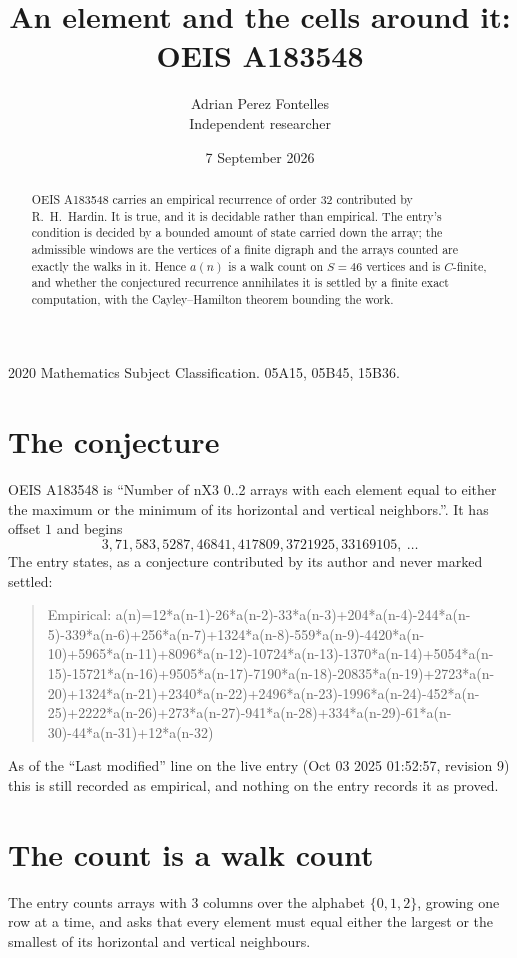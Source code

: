 \documentclass[11pt,a4paper]{article}
\title{An element and the cells around it: OEIS A183548}
\author{Adrian Perez Fontelles\\ \small Independent researcher}
\date{7 September 2026}
\theoremstyle{plain}
\theoremstyle{definition}
\begin{document}
\maketitle

\begin{abstract}
OEIS A183548 carries an empirical recurrence of order $32$ contributed by R.~H.~Hardin. It is
true, and it is decidable rather than empirical. The entry's condition is decided by a bounded amount of state carried down the array; the
admissible windows are the vertices of a finite digraph and the arrays counted are exactly the
walks in it. Hence $a(n)$ is a walk count on $S=46$ vertices and is $C$-finite, and whether the
conjectured recurrence annihilates it is settled by a finite exact computation, with the
Cayley--Hamilton theorem bounding the work.
\end{abstract}

\noindent\small 2020 Mathematics Subject Classification. 05A15, 05B45, 15B36.\normalsize

\section{The conjecture}

OEIS A183548 is ``Number of nX3 0..2 arrays with each element equal to either the maximum or the minimum of its horizontal and vertical neighbors.''. It has offset $1$ and begins
\[
3, 71, 583, 5287, 46841, 417809, 3721925, 33169105,\ \dots
\]
The entry states, as a conjecture contributed by its author and never marked settled:
\begin{quote}
Empirical: a(n)=12*a(n-1)-26*a(n-2)-33*a(n-3)+204*a(n-4)-244*a(n-5)-339*a(n-6)+256*a(n-7)+1324*a(n-8)-559*a(n-9)-4420*a(n-10)+5965*a(n-11)+8096*a(n-12)-10724*a(n-13)-1370*a(n-14)+5054*a(n-15)-15721*a(n-16)+9505*a(n-17)-7190*a(n-18)-20835*a(n-19)+2723*a(n-20)+1324*a(n-21)+2340*a(n-22)+2496*a(n-23)-1996*a(n-24)-452*a(n-25)+2222*a(n-26)+273*a(n-27)-941*a(n-28)+334*a(n-29)-61*a(n-30)-44*a(n-31)+12*a(n-32)
\end{quote}
As of the ``Last modified'' line on the live entry (Oct 03 2025 01:52:57, revision 9) this is still
recorded as empirical, and nothing on the entry records it as proved.

\section{The count is a walk count}

The entry counts arrays with $3$ columns over the alphabet $\{0,1,2\}$, growing one row at a time, and asks that every element must equal either the largest or the smallest of its horizontal and vertical neighbours.
\end{document}
